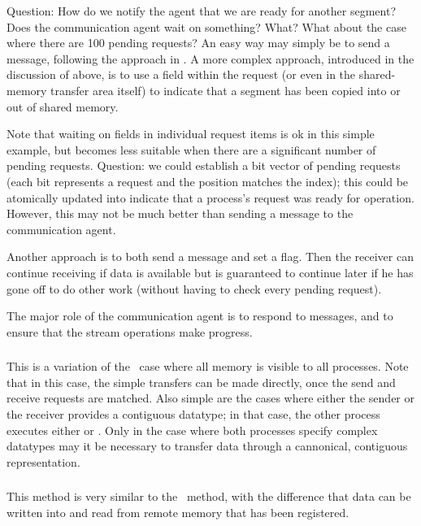 Question: How do we notify the agent that we are ready for another segment?
Does the communication agent wait on something?  What?  What about the case
where there are 100 pending requests?
An easy way may simply be to send a message, following the approach in
\tcpname.  A more complex approach, introduced in the discussion of
 above, is to use a field within the request (or even in the
shared-memory transfer area itself) to indicate that a segment has been copied
into or out of shared memory.  

Note that waiting on fields in individual request items is ok in this simple
example, but becomes less suitable when there are a significant number of
pending requests.  Question: we could establish a bit vector of pending
requests (each bit represents a request and the position matches the index);
this could be atomically updated into indicate that a process's 
request was ready for operation.  However, this may not be much better than
sending a message to the communication agent.

Another approach is to both send a message and set a flag.  Then the receiver
can continue receiving if data is available but is guaranteed to continue
later if he has gone off to do other work (without having to check every
pending request). 

The major role of the communication agent is to respond to messages, and to
ensure that the stream operations make progress.

\subsubsection{\shmemallname}
This is a variation of the \shmemname\ case where all memory is visible to all
processes.  Note that in this case, the simple transfers can be
made directly, once the send and receive requests are matched.  Also simple
are the cases where either the sender or the receiver provides a contiguous
datatype; in that case, the other process executes either
 or .  Only in the case where both
processes specify complex datatypes may it be necessary to transfer data
through a cannonical, contiguous representation.

\subsubsection{\vianame}

This method is very similar to the \tcpname\ method, with the difference that
data can be written into and read from remote memory that has been registered.

